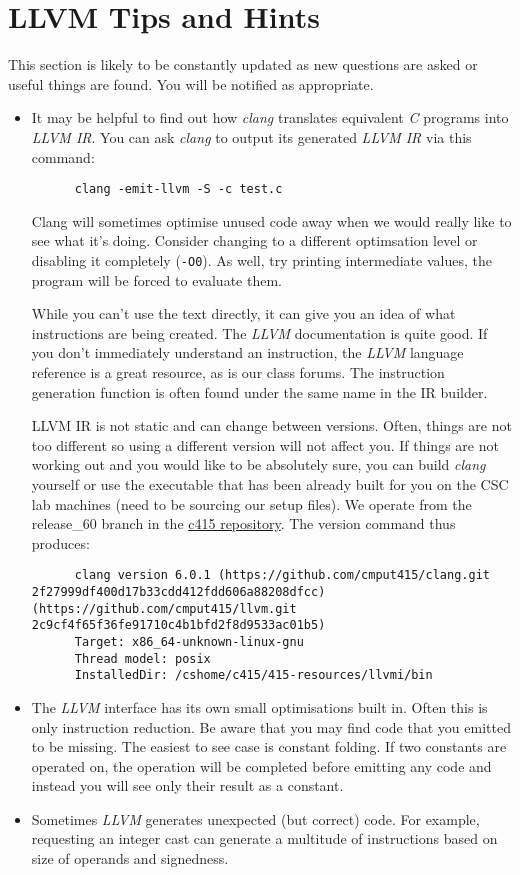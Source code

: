 \documentclass{article}
\newcommand{\code}[1]{\texttt{\textmd{#1}}}
\begin{document}
\section{LLVM Tips and Hints}
This section is likely to be constantly updated as new questions are asked or useful things are
found. You will be notified as appropriate.

\begin{itemize}
  \item
    It may be helpful to find out how \textit{clang} translates equivalent \textit{C} programs into
    \textit{LLVM IR}. You can ask \textit{clang} to output its generated \textit{LLVM IR} via this
    command:
    \begin{lstlisting}
      clang -emit-llvm -S -c test.c
    \end{lstlisting}
    Clang will sometimes optimise unused code away when we would really like to see what it's doing.
    Consider changing to a different optimsation level or disabling it completely (\code{-O0}). As
    well, try printing intermediate values, the program will be forced to evaluate them.

    While you can't use the text directly, it can give you an idea of what instructions are being
    created. The \textit{LLVM} documentation is quite good. If you don't immediately understand an
    instruction, the \textit{LLVM} language reference is a great resource, as is our class forums.
    The instruction generation function is often found under the same name in the IR builder.

    LLVM IR is not static and can change between versions. Often, things are not too different so
    using a different version will not affect you. If things are not working out and you would like
    to be absolutely sure, you can build \textit{clang} yourself or use the executable that has been
    already built for you on the CSC lab machines (need to be sourcing our setup files). We operate
    from the release\_60 branch in the \href{https://github.com/cmput415/clang}{c415 repository}.
    The version command thus produces:
    \begin{lstlisting}
      clang version 6.0.1 (https://github.com/cmput415/clang.git 2f27999df400d17b33cdd412fdd606a88208dfcc) (https://github.com/cmput415/llvm.git 2c9cf4f65f36fe91710c4b1bfd2f8d9533ac01b5)
      Target: x86_64-unknown-linux-gnu
      Thread model: posix
      InstalledDir: /cshome/c415/415-resources/llvmi/bin
    \end{lstlisting}
  \item
    The \textit{LLVM} interface has its own small optimisations built in. Often this is only
    instruction reduction. Be aware that you may find code that you emitted to be missing. The
    easiest to see case is constant folding. If two constants are operated on, the operation will be
    completed before emitting any code and instead you will see only their result as a constant.
  \item
    Sometimes \textit{LLVM} generates unexpected (but correct) code. For example, requesting an
    integer cast can generate a multitude of instructions based on size of operands and signedness.


\end{itemize}
\end{document}
